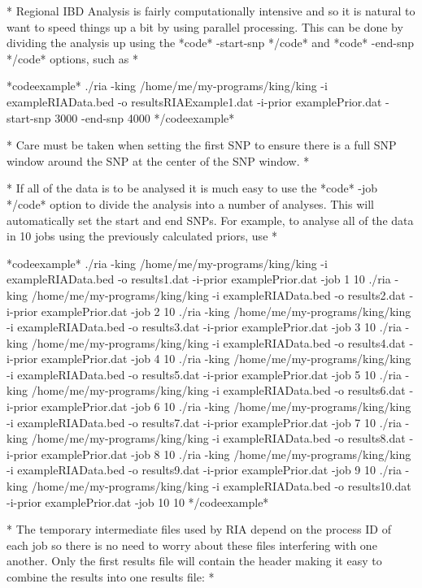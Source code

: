 *
Regional IBD Analysis is fairly computationally intensive and so it is natural to want to speed things up a bit by using parallel processing. This can be done by dividing the analysis up using the *code* -start-snp */code* and *code* -end-snp */code* options, such as
*


*codeexample*
./ria -king /home/me/my-programs/king/king -i exampleRIAData.bed -o resultsRIAExample1.dat -i-prior examplePrior.dat -start-snp 3000 -end-snp 4000
*/codeexample*

*
Care must be taken when setting the first SNP to ensure there is a full SNP window around the SNP at the center of the SNP window.
*

*
If all of the data is to be analysed it is much easy to use the *code* -job */code* option to divide the analysis into a number of analyses. This will automatically set the start and end SNPs. For example, to analyse all of the data in 10 jobs using the previously calculated priors, use
*

*codeexample*
./ria -king /home/me/my-programs/king/king -i exampleRIAData.bed -o results1.dat -i-prior examplePrior.dat -job 1 10
./ria -king /home/me/my-programs/king/king -i exampleRIAData.bed -o results2.dat -i-prior examplePrior.dat -job 2 10
./ria -king /home/me/my-programs/king/king -i exampleRIAData.bed -o results3.dat -i-prior examplePrior.dat -job 3 10
./ria -king /home/me/my-programs/king/king -i exampleRIAData.bed -o results4.dat -i-prior examplePrior.dat -job 4 10
./ria -king /home/me/my-programs/king/king -i exampleRIAData.bed -o results5.dat -i-prior examplePrior.dat -job 5 10
./ria -king /home/me/my-programs/king/king -i exampleRIAData.bed -o results6.dat -i-prior examplePrior.dat -job 6 10
./ria -king /home/me/my-programs/king/king -i exampleRIAData.bed -o results7.dat -i-prior examplePrior.dat -job 7 10
./ria -king /home/me/my-programs/king/king -i exampleRIAData.bed -o results8.dat -i-prior examplePrior.dat -job 8 10
./ria -king /home/me/my-programs/king/king -i exampleRIAData.bed -o results9.dat -i-prior examplePrior.dat -job 9 10
./ria -king /home/me/my-programs/king/king -i exampleRIAData.bed -o results10.dat -i-prior examplePrior.dat -job 10 10
*/codeexample*

*
The temporary intermediate files used by RIA depend on the process ID of each job so there is no need to worry about these files interfering with one another.
Only the first results file will contain the header making it easy to combine the results into one results file:
*


